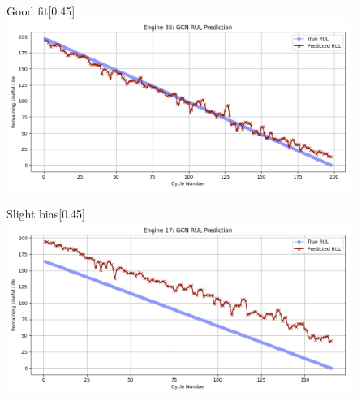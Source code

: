\documentclass[12pt]{article}
\begin{document}
\begin{figure}[H]
    \centering

    \begin{subcaptionbox}{Good fit\label{fig_NASA_GCN_eng6}}[0.45\textwidth]
        {\includegraphics[width=\linewidth]{figures/NASA/NASA_GCN_eng6.png}}
    \end{subcaptionbox}
    \hfill
    \begin{subcaptionbox}{Slight bias\label{fig_NASA_GCN_eng4}}[0.45\textwidth]
        {\includegraphics[width=\linewidth]{figures/NASA/NASA_GCN_eng4.png}}
    \end{subcaptionbox}

    \vspace{0.5cm}


\end{figure}
\end{document}
